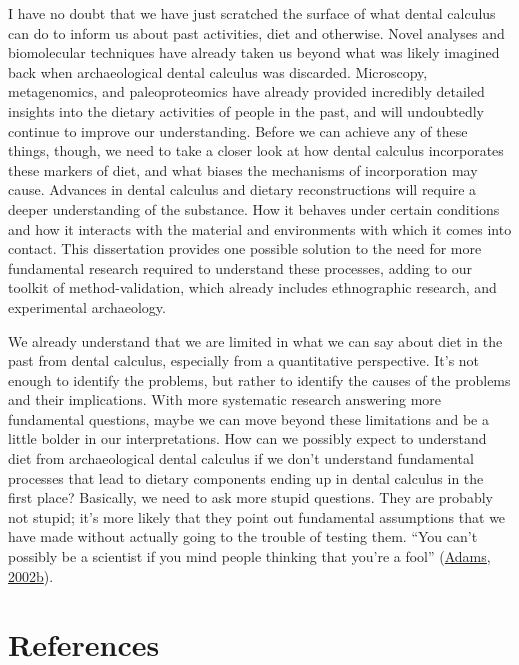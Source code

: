\documentclass[
  letterpaper,
]{book}
\begin{document}
I have no doubt that we have just scratched the surface of what dental
calculus can do to inform us about past activities, diet and otherwise.
Novel analyses and biomolecular techniques have already taken us beyond
what was likely imagined back when archaeological dental calculus was
discarded. Microscopy, metagenomics, and paleoproteomics have already
provided incredibly detailed insights into the dietary activities of
people in the past, and will undoubtedly continue to improve our
understanding. Before we can achieve any of these things, though, we
need to take a closer look at how dental calculus incorporates these
markers of diet, and what biases the mechanisms of incorporation may
cause. Advances in dental calculus and dietary reconstructions will
require a deeper understanding of the substance. How it behaves under
certain conditions and how it interacts with the material and
environments with which it comes into contact. This dissertation
provides one possible solution to the need for more fundamental research
required to understand these processes, adding to our toolkit of
method-validation, which already includes ethnographic research, and
experimental archaeology.

We already understand that we are limited in what we can say about diet
in the past from dental calculus, especially from a quantitative
perspective. It's not enough to identify the problems, but rather to
identify the causes of the problems and their implications. With more
systematic research answering more fundamental questions, maybe we can
move beyond these limitations and be a little bolder in our
interpretations. How can we possibly expect to understand diet from
archaeological dental calculus if we don't understand fundamental
processes that lead to dietary components ending up in dental calculus
in the first place? Basically, we need to ask more stupid questions.
They are probably not stupid; it's more likely that they point out
fundamental assumptions that we have made without actually going to the
trouble of testing them. ``You can't possibly be a scientist if you mind
people thinking that you're a fool''
(\protect\hyperlink{ref-adamsLongThanks2002}{Adams, 2002b}).

\hypertarget{references-3}{%
\section*{References}\label{references-3}}

\end{document}
